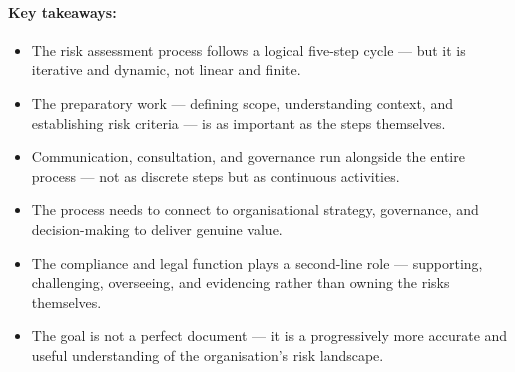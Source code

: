 \paragraph{Key takeaways:}
\begin{itemize}
  \item{The risk assessment process follows a logical five-step cycle — but it is iterative and dynamic, not linear and finite.}
  \item{The preparatory work — defining scope, understanding context, and establishing risk criteria — is as important as the steps themselves.}
  \item{Communication, consultation, and governance run alongside the entire process — not as discrete steps but as continuous activities.}
  \item{The process needs to connect to organisational strategy, governance, and decision-making to deliver genuine value.}
  \item{The compliance and legal function plays a second-line role — supporting, challenging, overseeing, and evidencing rather than owning the risks themselves.}
  \item{The goal is not a perfect document — it is a progressively more accurate and useful understanding of the organisation's risk landscape.}
\end{itemize}

